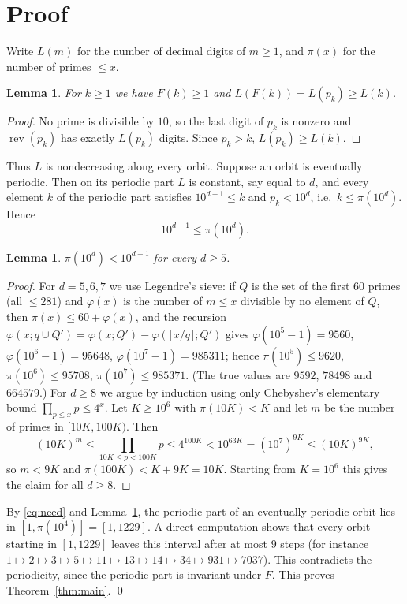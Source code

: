 \documentclass[11pt]{amsart}
\newtheorem{lemma}[theorem]{Lemma}
\theoremstyle{remark}
\begin{document}
\section{Proof}

Write $L(m)$ for the number of decimal digits of $m\ge1$, and $\pi(x)$ for the number of primes $\le x$.

\begin{lemma}\label{lem:digits}
For $k\ge 1$ we have $F(k)\ge 1$ and $L(F(k))=L(p_k)\ge L(k)$.
\end{lemma}

\begin{proof}
No prime is divisible by $10$, so the last digit of $p_k$ is nonzero and $\operatorname{rev}(p_k)$ has exactly $L(p_k)$ digits.
Since $p_k>k$, $L(p_k)\ge L(k)$.
\end{proof}

Thus $L$ is nondecreasing along every orbit.
Suppose an orbit is eventually periodic.
Then on its periodic part $L$ is constant, say equal to $d$, and every element $k$ of the periodic part satisfies $10^{d-1}\le k$ and $p_k<10^d$, i.e.\ $k\le\pi(10^d)$.
Hence
\begin{equation}\label{eq:need}
10^{d-1}\le\pi(10^d).
\end{equation}

\begin{lemma}\label{lem:pi}
$\pi(10^d)<10^{d-1}$ for every $d\ge 5$.
\end{lemma}

\begin{proof}
For $d=5,6,7$ we use Legendre's sieve: if $Q$ is the set of the first $60$ primes (all $\le 281$) and $\varphi(x)$ is the number of $m\le x$ divisible by no element of $Q$, then $\pi(x)\le 60+\varphi(x)$, and the recursion $\varphi(x;q\cup Q')=\varphi(x;Q')-\varphi(\lfloor x/q\rfloor;Q')$ gives
$\varphi(10^5-1)=9560$, $\varphi(10^6-1)=95648$, $\varphi(10^7-1)=985311$; hence $\pi(10^5)\le 9620$, $\pi(10^6)\le 95708$, $\pi(10^7)\le 985371$.
(The true values are $9592$, $78498$ and $664579$.)
For $d\ge 8$ we argue by induction using only Chebyshev's elementary bound $\prod_{p\le x}p\le 4^x$.
Let $K\ge 10^6$ with $\pi(10K)<K$ and let $m$ be the number of primes in $[10K,100K)$.
Then
\[
(10K)^m\le\prod_{10K\le p<100K}p\le 4^{100K}<10^{63K}=(10^7)^{9K}\le(10K)^{9K},
\]
so $m<9K$ and $\pi(100K)<K+9K=10K$.
Starting from $K=10^6$ this gives the claim for all $d\ge 8$.
\end{proof}

By \eqref{eq:need} and Lemma~\ref{lem:pi}, the periodic part of an eventually periodic orbit lies in $[1,\pi(10^4)]=[1,1229]$.
A direct computation shows that every orbit starting in $[1,1229]$ leaves this interval after at most $9$ steps (for instance $1\mapsto2\mapsto3\mapsto5\mapsto11\mapsto13\mapsto14\mapsto34\mapsto931\mapsto7037$).
This contradicts the periodicity, since the periodic part is invariant under $F$.
This proves Theorem~\ref{thm:main}. \qed
\end{document}
